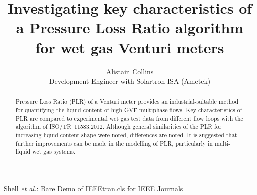 \documentclass[journal]{IEEEtran}
\begin{document}
%
\title{Investigating key characteristics of a Pressure Loss Ratio algorithm for wet gas Venturi meters
}
%
%
%

\author{Alistair~Collins\\
Development Engineer with Solartron ISA (Ametek)
}


%
{Shell \MakeLowercase{\textit{et al.}}: Bare Demo of IEEEtran.cls for IEEE Journals}
% 











\maketitle

\begin{abstract}
Pressure Loss Ratio (PLR) of a Venturi meter provides an industrial-suitable method for quantifying the liquid content of high GVF multiphase flows. Key characteristics of PLR are compared to experimental wet gas test data from different flow loops with the algorithm of ISO/TR~11583:2012. Although general similarities of the PLR for increasing liquid content shape were noted, differences are noted. It is suggested that further improvements can be made in the modelling of PLR, particularly in multi-liquid wet gas systems.
\end{abstract}
\end{document}
